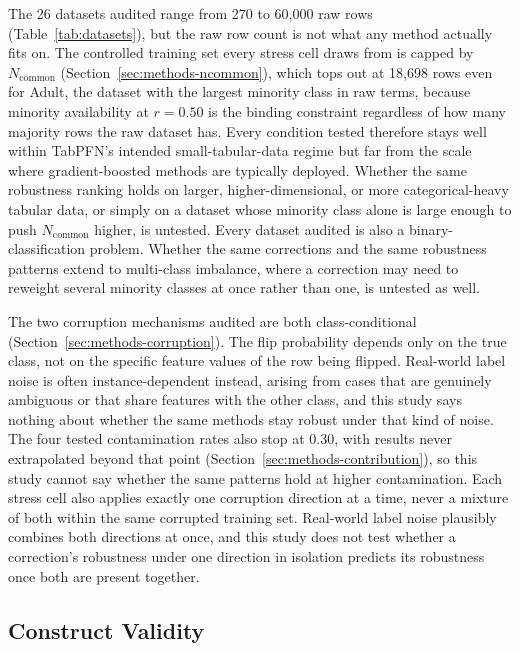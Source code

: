 The 26 datasets audited range from 270 to 60{,}000 raw rows
(Table~\ref{tab:datasets}), but the raw row count is not what any method
actually fits on. The controlled training set every stress cell draws
from is capped by $N_{\text{common}}$ (Section~\ref{sec:methods-ncommon}),
which tops out at 18{,}698 rows even for Adult, the dataset with the
largest minority class in raw terms, because minority availability at
$r{=}0.50$ is the binding constraint regardless of how many majority rows
the raw dataset has. Every condition
tested therefore stays well within TabPFN's intended small-tabular-data
regime but far from the scale where gradient-boosted methods are
typically deployed. Whether the same robustness ranking holds on larger,
higher-dimensional, or more categorical-heavy tabular data, or simply on
a dataset whose minority class alone is large enough to push
$N_{\text{common}}$ higher, is untested. Every dataset audited is also a
binary-classification problem. Whether the same corrections and the same
robustness patterns extend to multi-class imbalance, where a correction
may need to reweight several minority classes at once rather than one, is
untested as well.

The two corruption mechanisms audited are both
class-conditional (Section~\ref{sec:methods-corruption}). The flip
probability depends only on the true class, not on the specific
feature values of the row being flipped. Real-world label noise is
often instance-dependent instead, arising from cases that are
genuinely ambiguous or that share features with the other class, and
this study says nothing about whether the same methods stay robust
under that kind of noise. The four tested contamination rates also stop
at 0.30, with results never extrapolated beyond that point
(Section~\ref{sec:methods-contribution}), so this study cannot say
whether the same patterns hold at higher contamination. Each stress cell
also applies exactly one corruption direction at a time, never a mixture
of both within the same corrupted training set. Real-world label noise
plausibly combines both directions at once, and this study does not test
whether a correction's robustness under one direction in isolation
predicts its robustness once both are present together.

\subsection{Construct Validity}
\label{sec:threats-construct}

